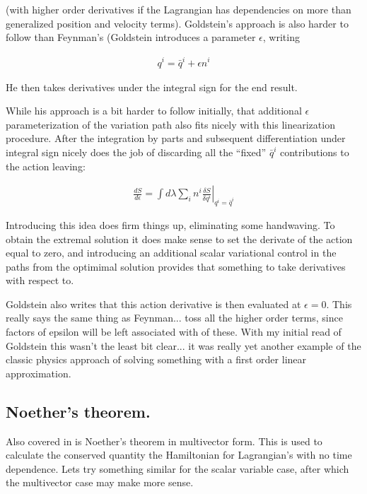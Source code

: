 \documentclass{article}
\newcommand{\qbar}[0]{\bar{q}}
\begin{document}
(with higher order derivatives if the Lagrangian has dependencies on more than generalized position and velocity terms).  Goldstein's 
approach is also harder to follow than Feynman's (Goldstein introduces a parameter $\epsilon$, writing

\begin{align}\label{eqn:epsilonvariation}
q^i = \qbar^i + \epsilon n^i
\end{align}

He then takes derivatives under the integral sign for the end result.

While his approach is a bit harder to follow initially, that additional $\epsilon$ parameterization of the variation path also fits nicely with this
linearization procedure.
After the integration by parts and subsequent differentiation under integral sign nicely does the job of
discarding all the ``fixed'' $\qbar^i$ contributions to the action leaving:

\begin{align*}
\frac{dS}{d\epsilon} = \int d\lambda \sum_i n^i \left. \frac{\delta S}{\delta q^i} \right\vert_{q^i = \qbar^i}
\end{align*}

Introducing this idea does firm things up, eliminating some handwaving.  To obtain the extremal solution it does
make sense to set the derivate of the action equal to zero, and introducing an additional scalar variational control
in the paths from the optimimal solution provides that something to take derivatives with respect to.

Goldstein also writes that this action derivative is then evaluated at $\epsilon = 0$.  This really says the same
thing as Feynman... toss all the higher order terms, since factors of epsilon will be left associated with of these.
With my initial read of Goldstein this wasn't the least bit clear... it was really yet another example of the classic
physics approach of solving something with a first order linear approximation.

\subsection{ Noether's theorem. }

Also covered in 
\cite{doran2003gap} is Noether's theorem in multivector form.  This is used
to calculate the conserved quantity the Hamiltonian for Lagrangian's with no
time dependence.  Lets try something similar for the scalar variable case,
after which the multivector case may make more sense.
\end{document}
